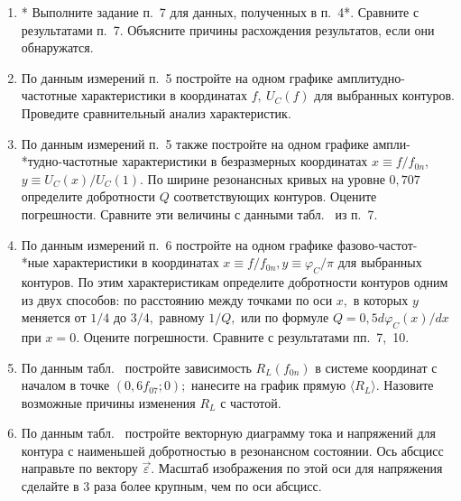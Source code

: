 \begin{lab:task}
\begin{enumerate}
		Представьте результат проделанных в работе  величин $L$ и $R_L$ в виде: $\langle L\rangle\pm\Delta L$ и $\langle R_L\rangle\pm\Delta R_L,$ где угловыми скобками отмечены средние значения, а символом $"\Delta"$~---~случайные погрешности величин $L$ и $R_L.$

		Оцените относительный вклад активных потерь в конденсаторах, представленных в табл.~ сопротивлением $R_{S~{max}},$ рассчитанным для максимального значения $\tg\delta=10^{-3},$ в суммарное активное сопротивление контура. Оцените влияние погрешностей приборов на результаты измерений.

    \item * Выполните задание п.~7 для данных, полученных в п.~4*. Сравните с результатами п.~7. Объясните причины расхождения результатов, если они обнаружатся.

    \item По данным измерений п.~5 постройте на одном графике амплитудно-частотные характеристики в координатах $ f,~U_C(f)$ для выбранных контуров. Проведите сравнительный анализ характеристик.

    \item По данным измерений п.~5 также постройте на одном графике ампли-\\*тудно-частотные характеристики в безразмерных координатах $x\equiv f/f_{0n}$, $y\equiv U_C(x)/U_C(1)$. По ширине резонансных кривых на уровне $0,707$ определите добротности $Q$ соответствующих контуров. Оцените погрешности. Сравните эти величины с данными табл.~ из п.~7.

    \item По данным измерений п.~6 постройте на одном графике фазово-частот-\\*ные характеристики в координатах $x\equiv f/f_{0n}, y\equiv\varphi_C/\pi$ для выбранных контуров. По этим характеристикам определите добротности контуров одним из двух способов: по расстоянию между точками по оси $x,$ в которых $y$ меняется от $1/4$ до $3/4,$ равному $1/Q,$ или по формуле $Q=0,5d\varphi_C(x)/dx$ при $x=0.$ Оцените погрешности. Сравните с результатами пп.~7,~10.

    \item По данным табл.~ постройте зависимость $R_L(f_{0n})$ в системе координат с началом в точке $(0,6f_{07};0);$ нанесите на график прямую $\langle R_L\rangle.$ Назовите возможные причины изменения $R_L$ с частотой.

    \item По данным табл.~ постройте векторную диаграмму тока и напряжений для контура с наименьшей добротностью в резонансном состоянии. Ось абсцисс направьте по вектору $\vec \varepsilon.$ Масштаб изображения по этой оси для напряжения сделайте в 3 раза более крупным, чем по оси абсцисс.
	\end{enumerate}
\end{lab:task}

